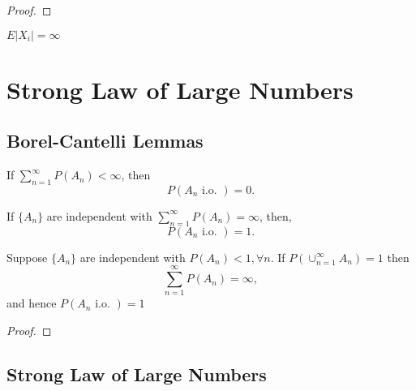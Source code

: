 \begin{proof}

\end{proof}

\begin{note}
    $E|X_i|=\infty$
\end{note}

\section{Strong Law of Large Numbers}

\subsection{Borel-Cantelli Lemmas}

\begin{lemma} \label{lem:borel-cantelli-lemma}
    If $\sum_{n=1}^{\infty}P\left(A_{n}\right)<\infty$, then
    \begin{equation}
        P\left(A_{n}\text{ i.o. }\right)=0.
    \end{equation}
\end{lemma}

\begin{lemma}
    If $\{A_n\}$ are independent with $\sum_{n=1}^{\infty}P\left(A_{n}\right)=\infty$, then,
    \begin{equation}
        P\left(A_{n}\text{ i.o. }\right)=1.
    \end{equation}
\end{lemma}

\begin{corollary}
    Suppose $\{A_{n}\}$ are independent with $P\left(A_{n}\right)<1,\forall n$. If $P\left(\cup_{n=1}^{\infty}A_{n}\right)=1$ then
    \begin{equation}
        \sum_{n=1}^{\infty}P\left(A_{n}\right)=\infty,
    \end{equation}
    and hence $P\left(A_{n}\text{ i.o. }\right)=1$
\end{corollary}

\begin{proof}

\end{proof}

\subsection{Strong Law of Large Numbers}

